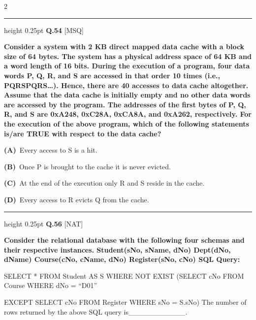 \documentclass[a4paper,10pt,twoside]{article}
\begin{document}
\begin{multicols}{2}
\par\vspace{6pt}\hrule height 0.25pt\vspace{6pt}
\noindent\textbf{Q.54} \hfill {\footnotesize\textsf{[MSQ]}}
\par\vspace{2pt}
{\bfseries Consider a system with 2 KB direct mapped data cache with a block size of 64 bytes.
The system has a physical address space of 64 KB and a word length of 16 bits.
During the execution of a program, four data words P, Q, R, and S are accessed in
that order 10 times (i.e., PQRSPQRS…). Hence, there are 40 accesses to data cache
altogether. Assume that the data cache is initially empty and no other data words are
accessed by the program. The addresses of the first bytes of P, Q, R, and S are
0xA248, 0xC28A, 0xCA8A, and 0xA262, respectively. For the execution of the
above program, which of the following statements is/are TRUE with respect to the
data cache? \par}
\par\vspace{2pt}\noindent
\textbf{(A)}~Every access to S is a hit.\par\vspace{2pt}\noindent
\textbf{(B)}~Once P is brought to the cache it is never evicted.\par\vspace{2pt}\noindent
\textbf{(C)}~At the end of the execution only R and S reside in the cache.\par\vspace{2pt}\noindent
\textbf{(D)}~Every access to R evicts Q from the cache.
\par\vspace{6pt}\hrule height 0.25pt\vspace{6pt}
\noindent\textbf{Q.56} \hfill {\footnotesize\textsf{[NAT]}}
\par\vspace{2pt}
{\bfseries Consider the relational database with the following four schemas and their
respective instances.
Student(sNo, sName, dNo) Dept(dNo, dName)
Course(cNo, cName, dNo) Register(sNo, cNo)
SQL Query:
\par\smallskip
SELECT * FROM Student AS S WHERE NOT EXIST
(SELECT cNo FROM Course WHERE dNo = ``D01''
\par\smallskip
EXCEPT
SELECT cNo FROM Register WHERE sNo = S.sNo)
The number of rows returned by the above SQL query is\_\_\_\_\_\_\_\_\_\_\_. \par}

\end{multicols}
\end{document}
